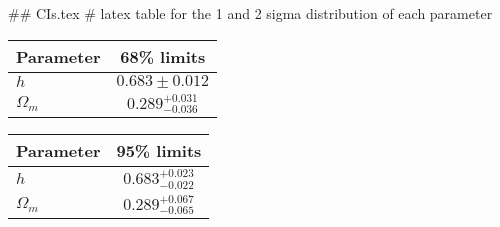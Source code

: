 ## CIs.tex
# latex table for the 1 and 2 sigma distribution of each parameter

\begin{tabular} { l  c}
 Parameter &  68\% limits\\
\hline
{\boldmath$h              $} & $0.683\pm 0.012            $\\
{\boldmath$\Omega_m       $} & $0.289^{+0.031}_{-0.036}   $\\
\hline
\end{tabular}

\begin{tabular} { l  c}
 Parameter &  95\% limits\\
\hline
{\boldmath$h              $} & $0.683^{+0.023}_{-0.022}   $\\
{\boldmath$\Omega_m       $} & $0.289^{+0.067}_{-0.065}   $\\
\hline
\end{tabular}
